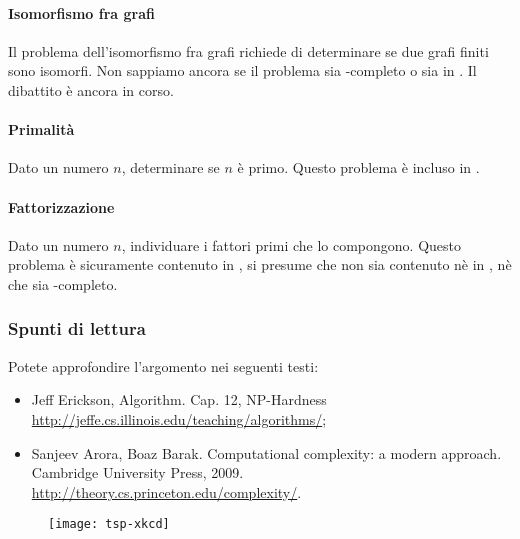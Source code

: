 \paragraph{Isomorfismo fra grafi}
Il problema dell’isomorfismo fra grafi richiede di determinare se due grafi finiti sono isomorfi.
Non sappiamo ancora se il problema sia {\NP}-completo o sia in {\PTIME}.
Il dibattito è ancora in corso.

\paragraph{Primalità}
Dato un numero \(n\), determinare se \(n\) è primo.
Questo problema è incluso in {\PTIME}.

\paragraph{Fattorizzazione}
Dato un numero \(n\), individuare i fattori primi che lo compongono.
Questo problema è sicuramente contenuto in {\NP}, si presume che non sia contenuto nè in {\PTIME}, nè che sia {\NP}-completo.

\subsubsection{Spunti di lettura}

Potete approfondire l'argomento nei seguenti testi:
\begin{itemize}
    \item Jeff Erickson, Algorithm. Cap. 12, NP-Hardness \href{http://jeffe.cs.illinois.edu/teaching/algorithms/}{http://jeffe.cs.illinois.edu/teaching/algorithms/};
    \item Sanjeev Arora, Boaz Barak. Computational complexity: a modern approach. Cambridge University Press, 2009. \href{http://theory.cs.princeton.edu/complexity/}{http://theory.cs.princeton.edu/complexity/}.
\end{itemize}

\begin{figure}[H]\centering
    \texttt{[image: tsp-xkcd]}
\end{figure}

\ifsubfile

\fi
